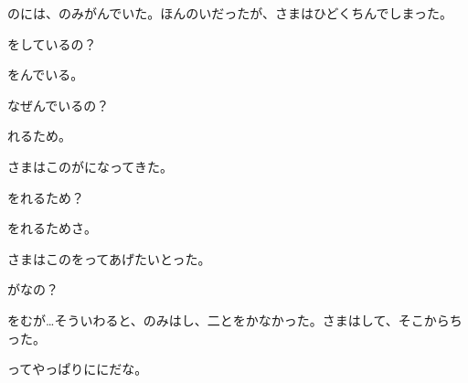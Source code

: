 のには、のみがんでいた。ほんのいだったが、さまはひどくちんでしまった。

をしているの？

をんでいる。

なぜんでいるの？

れるため。

さまはこのがになってきた。

をれるため？

をれるためさ。

さまはこのをってあげたいとった。

がなの？

をむが…そういわると、のみはし、二とをかなかった。さまはして、そこからちった。

ってやっぱりににだな。


